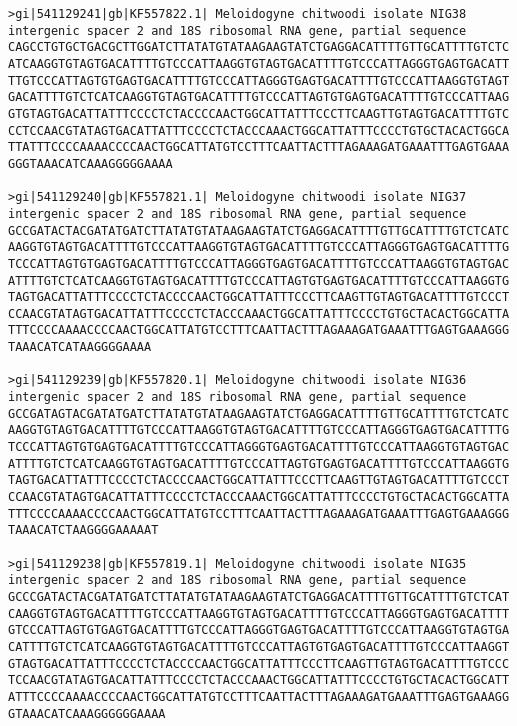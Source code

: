 \documentclass[11pt]{article}
\begin{document}
\begin{Verbatim}[commandchars=\\\{\}]
>gi|541129241|gb|KF557822.1| Meloidogyne chitwoodi isolate NIG38 intergenic spacer 2 and 18S ribosomal RNA gene, partial sequence
CAGCCTGTGCTGACGCTTGGATCTTATATGTATAAGAAGTATCTGAGGACATTTTGTTGCATTTTGTCTC
ATCAAGGTGTAGTGACATTTTGTCCCATTAAGGTGTAGTGACATTTTGTCCCATTAGGGTGAGTGACATT
TTGTCCCATTAGTGTGAGTGACATTTTGTCCCATTAGGGTGAGTGACATTTTGTCCCATTAAGGTGTAGT
GACATTTTGTCTCATCAAGGTGTAGTGACATTTTGTCCCATTAGTGTGAGTGACATTTTGTCCCATTAAG
GTGTAGTGACATTATTTCCCCTCTACCCCAACTGGCATTATTTCCCTTCAAGTTGTAGTGACATTTTGTC
CCTCCAACGTATAGTGACATTATTTCCCCTCTACCCAAACTGGCATTATTTCCCCTGTGCTACACTGGCA
TTATTTCCCCAAAACCCCAACTGGCATTATGTCCTTTCAATTACTTTAGAAAGATGAAATTTGAGTGAAA
GGGTAAACATCAAAGGGGGAAAA

>gi|541129240|gb|KF557821.1| Meloidogyne chitwoodi isolate NIG37 intergenic spacer 2 and 18S ribosomal RNA gene, partial sequence
GCCGATACTACGATATGATCTTATATGTATAAGAAGTATCTGAGGACATTTTGTTGCATTTTGTCTCATC
AAGGTGTAGTGACATTTTGTCCCATTAAGGTGTAGTGACATTTTGTCCCATTAGGGTGAGTGACATTTTG
TCCCATTAGTGTGAGTGACATTTTGTCCCATTAGGGTGAGTGACATTTTGTCCCATTAAGGTGTAGTGAC
ATTTTGTCTCATCAAGGTGTAGTGACATTTTGTCCCATTAGTGTGAGTGACATTTTGTCCCATTAAGGTG
TAGTGACATTATTTCCCCTCTACCCCAACTGGCATTATTTCCCTTCAAGTTGTAGTGACATTTTGTCCCT
CCAACGTATAGTGACATTATTTCCCCTCTACCCAAACTGGCATTATTTCCCCTGTGCTACACTGGCATTA
TTTCCCCAAAACCCCAACTGGCATTATGTCCTTTCAATTACTTTAGAAAGATGAAATTTGAGTGAAAGGG
TAAACATCATAAGGGGAAAA

>gi|541129239|gb|KF557820.1| Meloidogyne chitwoodi isolate NIG36 intergenic spacer 2 and 18S ribosomal RNA gene, partial sequence
GCCGATAGTACGATATGATCTTATATGTATAAGAAGTATCTGAGGACATTTTGTTGCATTTTGTCTCATC
AAGGTGTAGTGACATTTTGTCCCATTAAGGTGTAGTGACATTTTGTCCCATTAGGGTGAGTGACATTTTG
TCCCATTAGTGTGAGTGACATTTTGTCCCATTAGGGTGAGTGACATTTTGTCCCATTAAGGTGTAGTGAC
ATTTTGTCTCATCAAGGTGTAGTGACATTTTGTCCCATTAGTGTGAGTGACATTTTGTCCCATTAAGGTG
TAGTGACATTATTTCCCCTCTACCCCAACTGGCATTATTTCCCTTCAAGTTGTAGTGACATTTTGTCCCT
CCAACGTATAGTGACATTATTTCCCCTCTACCCAAACTGGCATTATTTCCCCTGTGCTACACTGGCATTA
TTTCCCCAAAACCCCAACTGGCATTATGTCCTTTCAATTACTTTAGAAAGATGAAATTTGAGTGAAAGGG
TAAACATCTAAGGGGAAAAAT

>gi|541129238|gb|KF557819.1| Meloidogyne chitwoodi isolate NIG35 intergenic spacer 2 and 18S ribosomal RNA gene, partial sequence
GCCCGATACTACGATATGATCTTATATGTATAAGAAGTATCTGAGGACATTTTGTTGCATTTTGTCTCAT
CAAGGTGTAGTGACATTTTGTCCCATTAAGGTGTAGTGACATTTTGTCCCATTAGGGTGAGTGACATTTT
GTCCCATTAGTGTGAGTGACATTTTGTCCCATTAGGGTGAGTGACATTTTGTCCCATTAAGGTGTAGTGA
CATTTTGTCTCATCAAGGTGTAGTGACATTTTGTCCCATTAGTGTGAGTGACATTTTGTCCCATTAAGGT
GTAGTGACATTATTTCCCCTCTACCCCAACTGGCATTATTTCCCTTCAAGTTGTAGTGACATTTTGTCCC
TCCAACGTATAGTGACATTATTTCCCCTCTACCCAAACTGGCATTATTTCCCCTGTGCTACACTGGCATT
ATTTCCCCAAAACCCCAACTGGCATTATGTCCTTTCAATTACTTTAGAAAGATGAAATTTGAGTGAAAGG
GTAAACATCAAAGGGGGGAAAA


\end{Verbatim}
\end{document}
